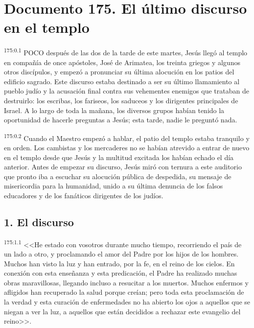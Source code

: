 \chapter{Documento 175. El último discurso en el templo}
\par 
\textsuperscript{175:0.1} POCO después de las dos de la tarde de este martes, Jesús llegó al templo en compañía de once apóstoles, José de Arimatea, los treinta griegos y algunos otros discípulos, y empezó a pronunciar su última alocución en los patios del edificio sagrado. Este discurso estaba destinado a ser su último llamamiento al pueblo judío y la acusación final contra sus vehementes enemigos que trataban de destruirlo: los escribas, los fariseos, los saduceos y los dirigentes principales de Israel. A lo largo de toda la mañana, los diversos grupos habían tenido la oportunidad de hacerle preguntas a Jesús; esta tarde, nadie le preguntó nada.

\par 
\textsuperscript{175:0.2} Cuando el Maestro empezó a hablar, el patio del templo estaba tranquilo y en orden. Los cambistas y los mercaderes no se habían atrevido a entrar de nuevo en el templo desde que Jesús y la multitud excitada los habían echado el día anterior. Antes de empezar su discurso, Jesús miró con ternura a este auditorio que pronto iba a escuchar su alocución pública de despedida, su mensaje de misericordia para la humanidad, unido a su última denuncia de los falsos educadores y de los fanáticos dirigentes de los judíos.

\section*{1. El discurso}
\par 
\textsuperscript{175:1.1} <<He estado con vosotros durante mucho tiempo, recorriendo el país de un lado a otro, y proclamando el amor del Padre por los hijos de los hombres. Muchos han visto la luz y han entrado, por la fe, en el reino de los cielos. En conexión con esta enseñanza y esta predicación, el Padre ha realizado muchas obras maravillosas, llegando incluso a resucitar a los muertos. Muchos enfermos y afligidos han recuperado la salud porque creían; pero toda esta proclamación de la verdad y esta curación de enfermedades no ha abierto los ojos a aquellos que se niegan a ver la luz, a aquellos que están decididos a rechazar este evangelio del reino>>.

